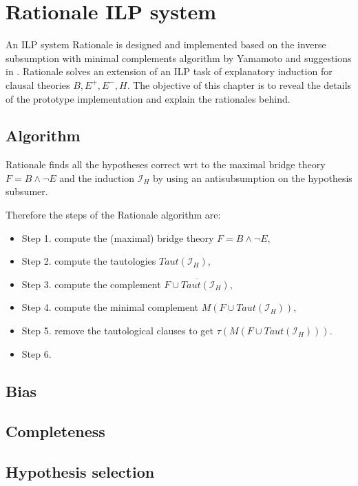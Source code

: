 \chapter{Rationale ILP system}\label{chap:rationale_ilp_system}
An ILP system Rationale is designed and implemented based on the inverse subsumption with minimal complements algorithm  by Yamamoto\cite{yamamoto2012inverse} and suggestions in . Rationale solves an extension of an ILP task of explanatory induction for clausal theories $B, E^+, E^-, H$. The objective of this chapter is to reveal the details of the prototype implementation and explain the rationales behind.

\section{Algorithm}
Rationale finds all the hypotheses correct wrt to the maximal bridge theory $F=B \land \neg E$ and the induction $\mathcal{I}_H$ by using an antisubsumption on the hypothesis subsumer.


Therefore the steps of the Rationale algorithm are:
\begin{itemize}
\item Step 1. compute the (maximal) bridge theory $F=B \land \neg E$,
\item Step 2. compute the tautologies $Taut(\mathcal{I}_H)$,
\item Step 3. compute the complement $\overline{F \cup Taut(\mathcal{I}_H)}$,
\item Step 4. compute the minimal complement $M(F \cup Taut(\mathcal{I}_H))$,
\item Step 5. remove the tautological clauses to get $\tau(M(F \cup Taut(\mathcal{I}_H)))$.
\item Step 6.  
\end{itemize}

\section{Bias}

\section{Completeness}

\section{Hypothesis selection}

